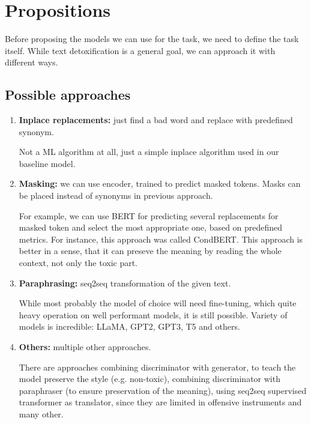 \section{Propositions}

Before proposing the models we can use for the task, we need to define the task
itself. While text detoxification is a general goal, we can approach it with
different ways.

\subsection{Possible approaches}

\begin{enumerate}
      \item \textbf{Inplace replacements:} just find a bad word and replace with predefined synonym.

            Not a ML algorithm at all, just a simple inplace algorithm used in our baseline
            model.
      \item \textbf{Masking:} we can use encoder, trained to predict masked tokens. Masks can be placed instead of synonyms in previous approach.

            For example, we can use BERT for predicting several replacements for masked
            token and select the most appropriate one, based on predefined metrics. For
            instance, this approach was called CondBERT. This approach is better in a
            sense, that it can preseve the meaning by reading the whole context, not only
            the toxic part.

      \item \textbf{Paraphrasing:} seq2seq transformation of the given text.

            While most probably the model of choice will need fine-tuning, which quite
            heavy operation on well performant models, it is still possible. Variety of
            models is incredible: LLaMA, GPT2, GPT3, T5 and others.

      \item \textbf{Others:} multiple other approaches.

            There are approaches combining discriminator with generator, to teach the model
            preserve the style (e.g. non-toxic), combining discriminator with paraphraser
            (to ensure preservation of the meaning), using seq2seq supervised transformer
            as translator, since they are limited in offensive instruments and many other.

\end{enumerate}

